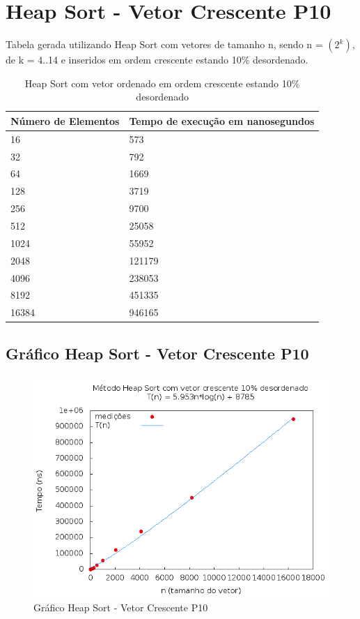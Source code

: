 \documentclass[12pt,a4paper,twoside]{report}
\begin{document}
\section{Heap Sort - Vetor Crescente P10}
Tabela gerada utilizando Heap Sort com vetores de tamanho n, sendo n = $(2^k)$, de k = 4..14 e inseridos em ordem crescente estando 10\% desordenado.
\begin{table}[H]
\centering
\caption{Heap Sort com vetor ordenado em ordem crescente estando 10\% desordenado}
\label{my-label}
\begin{tabular}{|l|l|}
\hline
\multicolumn{1}{|c|}{\textbf{Número de Elementos}} & \multicolumn{1}{c|}{\textbf{Tempo de execução em nanosegundos}} \\ \hline
16 & 573 \\ \hline
32 & 792 \\ \hline
64 & 1669 \\ \hline
128 & 3719 \\ \hline
256 & 9700 \\ \hline
512 & 25058 \\ \hline
1024 & 55952 \\ \hline
2048 & 121179 \\ \hline
4096 & 238053 \\ \hline
8192 & 451335 \\ \hline
16384 & 946165 \\ \hline
\end{tabular}
\end{table}

\subsection{Gráfico Heap Sort - Vetor Crescente P10}
\begin{figure}[H]
    \centering
    \includegraphics[width=0.7\linewidth]{graficos/HeapSort/vIntCrescenteP10/vIntCrescenteP10.png}
  \caption{Gráfico Heap Sort - Vetor Crescente P10}
\end{figure}
\end{document}
